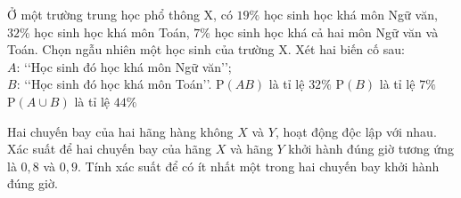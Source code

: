 \begin{ex}%
	Ở một trường trung học phổ thông X, có $19\%$ học sinh học khá môn Ngữ văn, $32\%$ học sinh học khá môn Toán, $7\%$ học sinh học khá cả hai môn Ngữ văn và Toán. Chọn ngẫu nhiên một học sinh của trường X. Xét hai biến cố sau:\\
	$A$: \lq \lq Học sinh đó học khá môn Ngữ văn\rq \rq;\\
	$B$: \lq \lq Học sinh đó học khá môn Toán\rq \rq.
	{$\mathrm{P}(AB)$ là tỉ lệ $32\%$}
	{$\mathrm{P}(B)$ là tỉ lệ $7\%$}	{\True $\mathrm{P}(A \cup B)$ là tỉ lệ $44\%$}
\end{ex}

\begin{ex}%
Hai chuyến bay của hai hãng hàng không $X$ và $Y$, hoạt động độc lập với nhau. Xác suất để hai chuyến bay của hãng $X$ và hãng $Y$ khởi hành đúng giờ tương ứng là $0{,}8$ và $0{,}9$. Tính xác suất để có ít nhất một trong hai chuyến bay khởi hành đúng giờ.
\end{ex}

